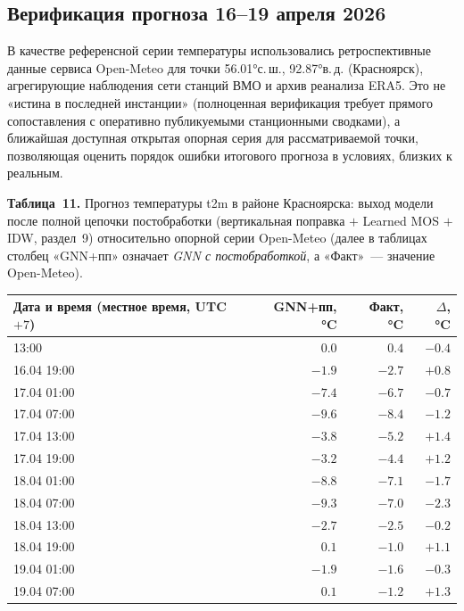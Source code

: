 \documentclass[14pt,a4paper]{extarticle}
\newcounter{none}
\numberwithin{table}{section}
\numberwithin{figure}{section}
\numberwithin{equation}{section}
\begin{document}
\subsection{Верификация прогноза 16--19 апреля 2026}\label{ux432ux435ux440ux438ux444ux438ux43aux430ux446ux438ux44f-ux43fux440ux43eux433ux43dux43eux437ux430-1619-ux430ux43fux440ux435ux43bux44f}

В качестве референсной серии температуры использовались
ретроспективные данные сервиса Open-Meteo для точки
56.01°с.\,ш., 92.87°в.\,д. (Красноярск), агрегирующие наблюдения сети
станций ВМО и архив реанализа ERA5. Это не «истина в последней
инстанции» (полноценная верификация требует прямого сопоставления с
оперативно публикуемыми станционными сводками), а ближайшая доступная
открытая опорная серия для рассматриваемой точки, позволяющая
оценить порядок ошибки итогового прогноза в условиях, близких
к реальным.

\textbf{Таблица~11.} Прогноз температуры t2m в районе Красноярска:
выход модели после полной цепочки постобработки (вертикальная
поправка $+$ Learned MOS $+$ IDW, раздел~9) относительно опорной
серии Open-Meteo (далее в таблицах столбец «GNN+пп» означает
\emph{GNN с постобработкой}, а «Факт»~--- значение Open-Meteo).

{\def\LTcaptype{none}
\begin{longtable}[]{@{}lrrr@{}}
\toprule\noalign{}
Дата и время (местное время, UTC$+7$) & GNN+пп, °C & Факт, °C & $\Delta$, °C \\
\midrule\noalign{}
\endhead
\bottomrule\noalign{}
\endlastfoot
16.04 13:00 &  $\phantom{-}0.0$ &  $\phantom{-}0.4$ & $-0.4$ \\
16.04 19:00 &  $-1.9$           &  $-2.7$           & $+0.8$ \\
17.04 01:00 &  $-7.4$           &  $-6.7$           & $-0.7$ \\
17.04 07:00 &  $-9.6$           &  $-8.4$           & $-1.2$ \\
17.04 13:00 &  $-3.8$           &  $-5.2$           & $+1.4$ \\
17.04 19:00 &  $-3.2$           &  $-4.4$           & $+1.2$ \\
18.04 01:00 &  $-8.8$           &  $-7.1$           & $-1.7$ \\
18.04 07:00 &  $-9.3$           &  $-7.0$           & $-2.3$ \\
18.04 13:00 &  $-2.7$           &  $-2.5$           & $-0.2$ \\
18.04 19:00 &  $\phantom{-}0.1$ &  $-1.0$           & $+1.1$ \\
19.04 01:00 &  $-1.9$           &  $-1.6$           & $-0.3$ \\
19.04 07:00 &  $\phantom{-}0.1$ &  $-1.2$           & $+1.3$ \\
\end{longtable}
}
\end{document}
